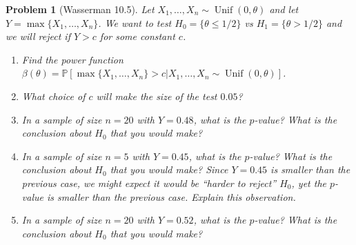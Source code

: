 \documentclass{article}
\newtheorem{problem}{Problem}
\newenvironment{solution}
  {\textbf{Solution.} }
  {}
\newcommand{\PP}{\mathbb{P}}
\begin{document}
\iffalse
\begin{solution}
    We write the power function
    \begin{align*}
        \beta(\theta) = \PP[T(X_1', \ldots, X_n') \in (a_\alpha,b_\alpha) | X_1', \ldots, X_n'\sim F_\theta].
    \end{align*}
    By definition,
    \begin{align*}
        \alpha 
        = \sup_{\theta\in\Theta_0}\beta(\theta) 
        = \sup_{\theta\in\Theta_0} \PP[T(X_1', \ldots, X_n') \in (a_\alpha,b_\alpha) | X_1', \ldots, X_n'\sim F_\theta].
    \end{align*}
\end{solution}
\fi

\begin{problem}[Wasserman 10.5]
    Let $X_1, \ldots, X_n\sim \operatorname{Unif}(0,\theta)$ and let $Y=\max\{X_1, \ldots, X_n\}$.
    We want to test $H_0 = \{ \theta  \leq 1/2 \}$ vs $H_1 = \{\theta>1/2\}$ and we will reject if $Y>c$ for some constant $c$.
    \begin{enumerate}[label=(\alph*),topsep=0pt]
        \item Find the power function $\beta(\theta) = \PP[\max\{X_1, \ldots, X_n\} > c | X_1, \ldots, X_n \sim \operatorname{Unif}(0,\theta) ]$.
        \item What choice of $c$ will make the size of the test $0.05$?
        \item In a sample of size $n=20$ with $Y=0.48$, what is the $p$-value? What is the conclusion about $H_0$ that you would make?
        \item In a sample of size $n=5$ with $Y=0.45$, what is the $p$-value? What is the conclusion about $H_0$ that you would make? Since $Y=0.45$ is smaller than the previous case, we might expect it would be ``harder to reject'' $H_0$, yet the $p$-value is smaller than the previous case. 
            Explain this observation. 
        \item In a sample of size $n=20$ with $Y=0.52$, what is the $p$-value? What is the conclusion about $H_0$ that you would make?
    \end{enumerate}

\end{problem}
\end{document}
